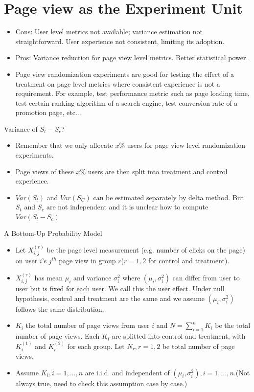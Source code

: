 \documentclass[xcolor=x11names,table]{beamer}
\begin{document}
\section{Page view as the Experiment Unit}
\begin{frame}
\begin{itemize}
\item Cons: User level metrics not available; variance estimation not straightforward. User experience not consistent, limiting its adoption. 
\item Pros: Variance reduction for page view level metrics. Better statistical power. 
\item Page view randomization experiments are good for testing the effect of a treatment on page level metrics where consistent experience is not a requirement. For example, test performance metric such as page loading time, test certain ranking algorithm of a search engine, test conversion rate of a promotion page, etc...
\end{itemize}
\end{frame}

\begin{frame}{Variance of $S_t-S_c$?} 
\begin{itemize}
\item Remember that we only allocate $x\%$ users for page view level randomization experiments. 
\item Page views of these $x\%$ users are then split into treatment and control experience.
\item $Var(S_t)$ and $Var(S_C)$ can be estimated separately by delta method. But $S_t$ and $S_c$ are not independent and it is unclear how to compute $Var(S_t-S_c)$
\end{itemize}
\end{frame}


\begin{frame}{A Bottom-Up Probability Model}
\begin{itemize}
\item  Let $X_{i,j}^{(r)}$ be the page level measurement (e.g. number of clicks on the page) on user $i$'s $j^{th}$ page view in group $r$($r=1,2$ for control and treatment).
\item $X_{i,j}^{(r)}$  has mean $\mu_i$ and variance $\sigma_i^2$ where $(\mu_i, \sigma_i^2)$ can differ from user to user but is fixed for each user. We call this the user effect. Under null hypothesis, control and treatment are the same and we assume $(\mu_i, \sigma_i^2)$ follows the same distribution.
\item $K_i$ the total number of page views from user $i$ and $N = \sum_{i=1}^n K_i$ be the total number of page views. Each $K_i$ are splitted into control and treatment, with $K_i^{(1)}$ and $K_i^{(2)}$ for each group. Let $N_{r}, r=1,2$ be total number of page views. 
\item Assume $K_i,i=1,\dots,n$ are i.i.d. and independent of $(\mu_i,\sigma_i^2),i=1,\dots,n$.(Not always true, need to check this assumption case by case.) 
\end{itemize}
\end{frame}
\end{document}
